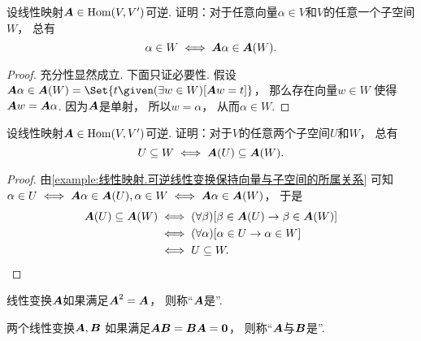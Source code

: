 \begin{example}\label{example:线性映射.可逆线性变换保持向量与子空间的所属关系}
设线性映射\(\boldsymbol{A} \in \operatorname{Hom}(V,V')\)可逆.
证明：对于任意向量\(\alpha \in V\)和\(V\)的任意一个子空间\(W\)，
总有\begin{equation*}
	\alpha \in W
	\iff
	\boldsymbol{A}\alpha \in \boldsymbol{A}(W).
\end{equation*}
\begin{proof}
充分性显然成立.
下面只证必要性.
假设\(
	\vb{A}\alpha
	\in \vb{A}(W)
	= \Set{
		t
		\given
		(\exists w \in W)
		[
			\vb{A}w = t
		]
	}
\)，
那么存在向量\(w \in W\)
使得\(
	\boldsymbol{A}w = \boldsymbol{A}\alpha
\).
因为\(\boldsymbol{A}\)是单射，
所以\(w = \alpha\)，
从而\(\alpha \in W\).
\end{proof}
\end{example}

\begin{example}\label{example:线性映射.可逆线性变换保持子空间之间的包含关系}
设线性映射\(\boldsymbol{A} \in \operatorname{Hom}(V,V')\)可逆.
证明：对于\(V\)的任意两个子空间\(U\)和\(W\)，
总有\begin{equation*}
	U \subseteq W
	\iff
	\boldsymbol{A}(U) \subseteq \boldsymbol{A}(W).
\end{equation*}
\begin{proof}
由\cref{example:线性映射.可逆线性变换保持向量与子空间的所属关系}
可知\(
	\alpha \in U \iff \boldsymbol{A}\alpha \in \boldsymbol{A}(U),
	\alpha \in W \iff \boldsymbol{A}\alpha \in \boldsymbol{A}(W)
\)，
于是\begin{align*}
	\boldsymbol{A}(U) \subseteq \boldsymbol{A}(W)
	&\iff
	(\forall \beta)
	[
		\beta \in \boldsymbol{A}(U)
		\rightarrow
		\beta \in \boldsymbol{A}(W)
	] \\
	&\iff
	(\forall \alpha)
	[
		\alpha \in U
		\rightarrow
		\alpha \in W
	] \\
	&\iff
	U \subseteq W.
	\qedhere
\end{align*}
\end{proof}
\end{example}

\begin{definition}
线性变换\(\boldsymbol{A}\)如果满足\(\boldsymbol{A}^2=\boldsymbol{A}\)，
则称“\(\boldsymbol{A}\)是”.
\end{definition}

\begin{definition}
两个线性变换\(\boldsymbol{A},\boldsymbol{B}\)
如果满足\(\boldsymbol{A} \boldsymbol{B}=\boldsymbol{B} \boldsymbol{A}=\boldsymbol0\)，
则称“\(\boldsymbol{A}\)与\(\boldsymbol{B}\)是”.
\end{definition}

